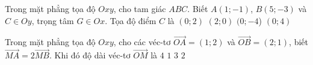 \begin{ex}%
	Trong mặt phẳng tọa độ $Oxy$, cho tam giác $ABC$. Biết $A(1;-1)$, $B(5;-3)$ và $C \in Oy$, trọng tâm $G \in Ox$. Tọa độ điểm $C$ là
	\choice
	{$(0;2)$}
	{$(2;0)$}
	{$(0;-4$)}
	{\True$(0;4)$}
\end{ex}
\begin{ex}%
	Trong mặt phẳng tọa độ $Oxy$, cho các véc-tơ $\overrightarrow{OA} = (1;2)$ và $\overrightarrow{OB} = (2;1)$, biết $\overrightarrow{MA}=2\overrightarrow{MB}$. Khi đó độ dài véc-tơ $\overrightarrow{OM}$ là 
	\choice
	{$4$}
	{$1$}
	{\True $3$}
	{$2$}
\end{ex}


